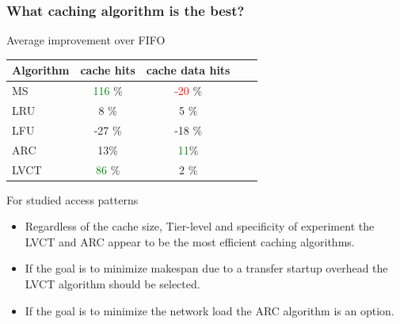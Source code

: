 \documentclass{beamer}
\begin{document}
\begin{frame}\frametitle{What caching algorithm is the best? }
\vspace{-5mm}
  \begin{block}{Average improvement over FIFO}

	\begin{table}\begin{tabular}{|l|c|c|c|c|}
\hline
Algorithm & cache hits & cache data hits\\ \hline

MS & \textcolor{green}{116} \% & \textcolor{red}{-20} \% \\ \hline
LRU & 8 \% & 5 \% \\ \hline
LFU & -27 \% & -18 \% \\ \hline
ARC & 13\% & \textcolor{green}{11}\%\\ \hline
LVCT & \textcolor{green}{86} \%& 2 \%\\ \hline
\end{tabular}	
\end{table}
  \end{block}  
  
\begin{footnotesize}
\begin{block}{For studied access patterns}
\begin{itemize}
\item Regardless of the cache size, Tier-level and specificity of experiment the LVCT and ARC appear to be the most efficient  caching algorithms.
\item If the goal is to minimize makespan due to a transfer startup overhead the LVCT algorithm should be selected.
	\item If the goal is to minimize the network load the ARC algorithm is an option.
\end{itemize}
\end{block}
\end{footnotesize}  
\end{frame}
\end{document}
